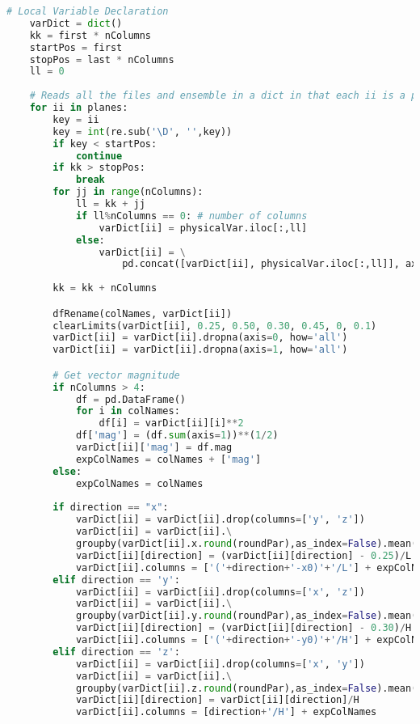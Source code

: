 \begin{lstlisting}[language=python]
    # Local Variable Declaration
    varDict = dict()
    kk = first * nColumns
    startPos = first
    stopPos = last * nColumns
    ll = 0
  
    # Reads all the files and ensemble in a dict in that each ii is a plane
    for ii in planes:
        key = ii
        key = int(re.sub('\D', '',key))
        if key < startPos:
            continue
        if kk > stopPos: 
            break
        for jj in range(nColumns):
            ll = kk + jj
            if ll%nColumns == 0: # number of columns
                varDict[ii] = physicalVar.iloc[:,ll]
            else:
                varDict[ii] = \
                    pd.concat([varDict[ii], physicalVar.iloc[:,ll]], axis=1)
                    
        kk = kk + nColumns

        dfRename(colNames, varDict[ii])
        clearLimits(varDict[ii], 0.25, 0.50, 0.30, 0.45, 0, 0.1)
        varDict[ii] = varDict[ii].dropna(axis=0, how='all')
        varDict[ii] = varDict[ii].dropna(axis=1, how='all')

        # Get vector magnitude
        if nColumns > 4:
            df = pd.DataFrame()
            for i in colNames:
                df[i] = varDict[ii][i]**2
            df['mag'] = (df.sum(axis=1))**(1/2)
            varDict[ii]['mag'] = df.mag
            expColNames = colNames + ['mag']
        else:
            expColNames = colNames
            
        if direction == "x":
            varDict[ii] = varDict[ii].drop(columns=['y', 'z'])
            varDict[ii] = varDict[ii].\
            groupby(varDict[ii].x.round(roundPar),as_index=False).mean()
            varDict[ii][direction] = (varDict[ii][direction] - 0.25)/L
            varDict[ii].columns = ['('+direction+'-x0)'+'/L'] + expColNames
        elif direction == 'y':
            varDict[ii] = varDict[ii].drop(columns=['x', 'z'])
            varDict[ii] = varDict[ii].\
            groupby(varDict[ii].y.round(roundPar),as_index=False).mean()
            varDict[ii][direction] = (varDict[ii][direction] - 0.30)/H
            varDict[ii].columns = ['('+direction+'-y0)'+'/H'] + expColNames
        elif direction == 'z':
            varDict[ii] = varDict[ii].drop(columns=['x', 'y'])
            varDict[ii] = varDict[ii].\
            groupby(varDict[ii].z.round(roundPar),as_index=False).mean()
            varDict[ii][direction] = varDict[ii][direction]/H
            varDict[ii].columns = [direction+'/H'] + expColNames
            

\end{lstlisting}
